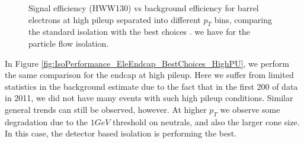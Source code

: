 \begin{figure}[!htbp]
\begin{center}
\caption{Signal efficiency (HWW130) vs background efficiency for barrel electrons at high pileup
separated into different $p_{T}$ bins, comparing the standard isolation with the best choices .
we have for the particle flow isolation.}
\label{fig:IsoPerformance_EleBarrel_BestChoices_HighPU}
\end{center}
\end{figure}

\clearpage

In Figure \ref{fig:IsoPerformance_EleEndcap_BestChoices_HighPU}, we perform the same comparison for
the endcap at high pileup. Here we suffer from limited statistics in the background estimate
due to the fact that in the first $200$ \ipb of data in 2011, we did not have many events with
such high pileup conditions. Similar general trends can still be observed, however. At higher
$p_{T}$ we observe some degradation due to the $1GeV$ threshold on neutrals, and also the larger
cone size. In this case, the detector based isolation is performing the best.

